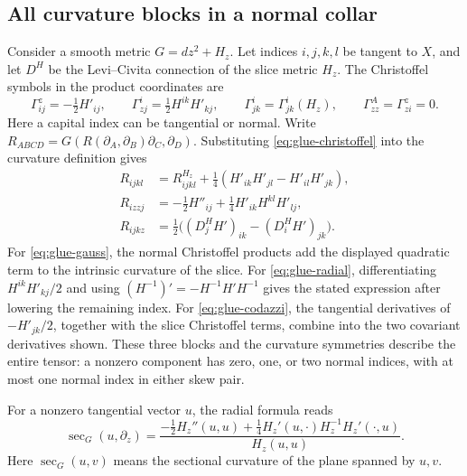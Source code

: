 \documentclass[12pt]{amsart}
\numberwithin{equation}{section}
\theoremstyle{remark}
\newcommand{\Ksec}{\operatorname{sec}}
\begin{document}
\subsection{All curvature blocks in a normal collar}
Consider a smooth metric \(G=dz^2+H_z\). Let indices \(i,j,k,l\)
be tangent to \(X\), and let \(D^H\) be the Levi--Civita
connection of the slice metric \(H_z\). The Christoffel symbols
in the product coordinates are
\begin{equation}\label{eq:glue-christoffel}
 \Gamma^z_{ij}=-\tfrac12H'_{ij},\qquad
 \Gamma^i_{zj}=\tfrac12H^{ik}H'_{kj},\qquad
 \Gamma^i_{jk}=\Gamma^i_{jk}(H_z),\qquad
 \Gamma^A_{zz}=\Gamma^z_{zi}=0.
\end{equation}
Here a capital index can be tangential or normal. Write
\(R_{ABCD}=G(R(\partial_A,\partial_B)\partial_C,\partial_D)\).
Substituting
\eqref{eq:glue-christoffel} into the curvature definition gives
\begin{align}
 R_{ijkl}&=R^{H_z}_{ijkl}
       +\tfrac14(H'_{ik}H'_{jl}-H'_{il}H'_{jk}),
       \label{eq:glue-gauss}\\
 R_{izzj}&=-\tfrac12H''_{ij}
       +\tfrac14H'_{ik}H^{kl}H'_{lj},
       \label{eq:glue-radial}\\
 R_{ijkz}&=\tfrac12\bigl((D^H_jH')_{ik}-(D^H_iH')_{jk}\bigr).
       \label{eq:glue-codazzi}
\end{align}
For \eqref{eq:glue-gauss}, the normal Christoffel products
add the displayed quadratic term to the intrinsic curvature of
the slice. For \eqref{eq:glue-radial}, differentiating
\(H^{ik}H'_{kj}/2\) and using
\((H^{-1})'=-H^{-1}H'H^{-1}\) gives the stated expression
after lowering the remaining index. For
\eqref{eq:glue-codazzi}, the tangential derivatives of
\(-H'_{jk}/2\), together with the slice Christoffel terms,
combine into the two covariant derivatives shown. These three
blocks and the curvature symmetries describe the entire tensor:
a nonzero component has zero, one, or two normal indices, with
at most one normal index in either skew pair.

For a nonzero tangential vector \(u\), the radial formula reads
\begin{equation}\label{eq:glue-radial-sectional}
 \Ksec_G(u,\partial_z)=
 \frac{-\tfrac12H_z''(u,u)
  +\tfrac14H_z'(u,\cdot)H_z^{-1}H_z'(\cdot,u)}{H_z(u,u)}.
\end{equation}
Here \(\Ksec_G(u,v)\) means the sectional curvature of the
plane spanned by \(u,v\).
\end{document}
